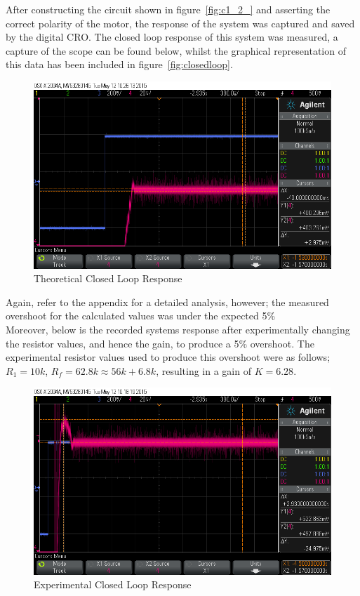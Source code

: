 \documentclass[11pt,a4paper]{article}
\begin{document}
After constructing the circuit shown in figure~\ref{fig:c1_2_} and asserting the correct polarity of the motor, the response of the system was captured and saved by the digital CRO. The closed loop response of this system was measured, a capture of the scope can be found below, whilst the graphical representation of this data has been included in figure~\ref{fig:closedloop}.\\
	\begin{figure}[H]
		\centering
			\includegraphics[width=0.5\linewidth]{Oscilloscope/PartC_Theoretical_Overshoot.png} 
			\caption{Theoretical Closed Loop Response}
			\label{fig:calcgain}
	\end{figure}


Again, refer to the appendix for a detailed analysis, however; the measured overshoot for the calculated values was under the expected 5\% \\
Moreover, below is the recorded systems response after experimentally changing the resistor values, and hence the gain, to produce a 5\% overshoot. The experimental resistor values used to produce this overshoot were as follows; $R_1 = 10k$, $R_f = 62.8k \approx 56k + 6.8k$, resulting in a gain of $K = 6.28$. 

	\begin{figure}[H]
		\centering
		\includegraphics[width=0.5\linewidth]{Oscilloscope/PartC_Experimental_Overshoot.png}
		\caption{Experimental Closed Loop Response}
		\label{fig:expgain}
	\end{figure}
\end{document}
